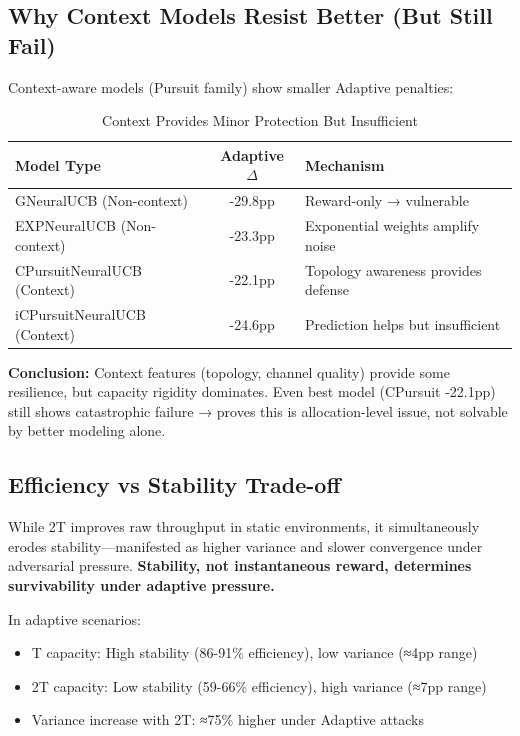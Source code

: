 \documentclass[11pt,a4paper]{article}
\begin{document}
\subsection{Why Context Models Resist Better (But Still Fail)}

Context-aware models (Pursuit family) show smaller Adaptive penalties:

\vspace{-0.4cm}

\begin{table}[h]
\scriptsize
\centering
\begin{tabular}{lcl}
\toprule
\textbf{Model Type} & \textbf{Adaptive $\Delta$} & \textbf{Mechanism} \\
\midrule
GNeuralUCB (Non-context) & -29.8pp & Reward-only → vulnerable \\
EXPNeuralUCB (Non-context) & -23.3pp & Exponential weights amplify noise \\
CPursuitNeuralUCB (Context) & -22.1pp & Topology awareness provides defense \\
iCPursuitNeuralUCB (Context) & -24.6pp & Prediction helps but insufficient \\
\bottomrule
\end{tabular}
\vspace{-0.2cm}
\caption{Context Provides Minor Protection But Insufficient}
\end{table}

\vspace{-0.2cm}

\textbf{Conclusion:} Context features (topology, channel quality) provide some resilience, but capacity rigidity dominates. Even best model (CPursuit -22.1pp) still shows catastrophic failure → proves this is allocation-level issue, not solvable by better modeling alone.

\subsection{Efficiency vs Stability Trade-off}

While 2T improves raw throughput in static environments, it simultaneously erodes stability—manifested as higher variance and slower convergence under adversarial pressure. \textbf{Stability, not instantaneous reward, determines survivability under adaptive pressure.}

In adaptive scenarios:
\begin{itemize}
\item T capacity: High stability (86-91\% efficiency), low variance (≈4pp range)
\item 2T capacity: Low stability (59-66\% efficiency), high variance (≈7pp range)
\item Variance increase with 2T: ≈75\% higher under Adaptive attacks
\end{itemize}
\end{document}
